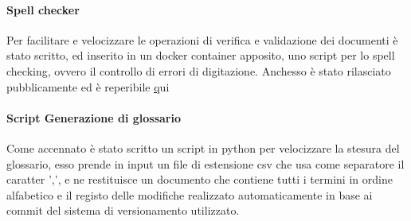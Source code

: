   \paragraph{Spell checker}
  Per facilitare e velocizzare le operazioni di verifica e validazione dei documenti è
  stato scritto, ed inserito in un docker container apposito, uno script per lo
  spell checking, ovvero il controllo di errori di digitazione.
  Anchesso è stato rilasciato pubblicamente ed è reperibile \href{https://github.com/Jatus93/spellCheck}qui

  \paragraph{Script Generazione di glossario}
  Come accennato è stato scritto un script in python per velocizzare la stesura
  del glossario, esso prende in input un file di estensione csv che usa come
  separatore il caratter ',', e ne restituisce un documento che contiene tutti i
  termini in ordine alfabetico e il registo delle modifiche realizzato automaticamente
  in base ai commit del sistema di versionamento utilizzato.
